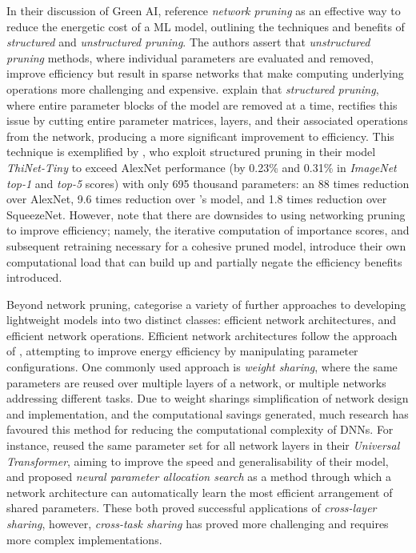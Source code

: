 \documentclass[a4paper, 12pt]{article}
\begin{document}
    In their discussion of Green AI,  reference \emph{network pruning} as an effective way to reduce the energetic cost of a ML model, outlining the techniques and benefits of \emph{structured} and \emph{unstructured pruning}. The authors assert that \emph{unstructured pruning} methods, where individual parameters are evaluated and removed, improve efficiency but result in sparse networks that make computing underlying operations more challenging and expensive.  explain that \emph{structured pruning}, where entire parameter blocks of the model are removed at a time, rectifies this issue by cutting entire parameter matrices, layers, and their associated operations from the network, producing a more significant improvement to efficiency. This technique is exemplified by , who exploit structured pruning in their model \emph{ThiNet-Tiny} to exceed AlexNet performance (by 0.23\% and 0.31\% in \emph{ImageNet top-1} and \emph{top-5} scores) with only 695 thousand parameters: an 88 times reduction over AlexNet, 9.6 times reduction over 's model, and 1.8 times reduction over SqueezeNet. However,  note that there are downsides to using networking pruning to improve efficiency; namely, the iterative computation of importance scores, and subsequent retraining necessary for a cohesive pruned model, introduce their own computational load that can build up and partially negate the efficiency benefits introduced.

    Beyond network pruning,  categorise a variety of further approaches to developing lightweight models into two distinct classes: efficient network architectures, and efficient network operations. Efficient network architectures follow the approach of , attempting to improve energy efficiency by manipulating parameter configurations. One commonly used approach is \emph{weight sharing}, where the same parameters are reused over multiple layers of a network, or multiple networks addressing different tasks. Due to weight sharings simplification of network design and implementation, and the computational savings generated, much research has favoured this method for reducing the computational complexity of DNNs. For instance,  reused the same parameter set for all network layers in their \emph{Universal Transformer}, aiming to improve the speed and generalisability of their model, and  proposed \emph{neural parameter allocation search} as a method through which a network architecture can automatically learn the most efficient arrangement of shared parameters. These both proved successful applications of \emph{cross-layer sharing}, however, \emph{cross-task sharing} has proved more challenging and requires more complex implementations. 
\end{document}
